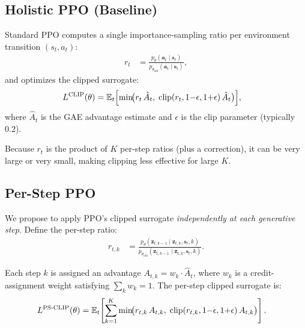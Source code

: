 \subsection{Holistic PPO (Baseline)}
\label{sec:method:holistic}

Standard PPO computes a single importance-sampling ratio per environment
transition $(s_t, a_t)$:
\begin{align}
  r_t
    &= \frac{p_\theta(\mathbf{a}_t\mid\mathbf{s}_t)}
            {p_{\theta_{\text{old}}}(\mathbf{a}_t\mid\mathbf{s}_t)},
  \label{eq:holistic_ratio}
\end{align}
and optimizes the clipped surrogate:
\begin{align}
  L^{\text{CLIP}}(\theta)
    &= \mathbb{E}_t\Bigl[
         \min\!\bigl(
           r_t\, \hat{A}_t,\;
           \mathrm{clip}(r_t, 1{-}\epsilon, 1{+}\epsilon)\,\hat{A}_t
         \bigr)
       \Bigr],
  \label{eq:ppo_clip}
\end{align}
where $\hat{A}_t$ is the GAE advantage estimate and $\epsilon$ is the clip
parameter (typically $0.2$).

Because $r_t$ is the product of $K$ per-step ratios (plus a correction),
it can be very large or very small, making clipping less effective for
large $K$.

\subsection{Per-Step PPO}
\label{sec:method:perstep}

We propose to apply PPO's clipped surrogate \emph{independently at each
generative step}.  Define the per-step ratio:
\begin{align}
  r_{t,k}
    &= \frac{p_\theta(\mathbf{z}_{t,k-1}\mid\mathbf{z}_{t,k},\mathbf{s}_t,k)}
            {p_{\theta_{\text{old}}}(\mathbf{z}_{t,k-1}\mid\mathbf{z}_{t,k},\mathbf{s}_t,k)}.
  \label{eq:perstep_ratio}
\end{align}

Each step $k$ is assigned an advantage $A_{t,k} = w_k \cdot \hat{A}_t$, where
$w_k$ is a credit-assignment weight satisfying $\sum_k w_k = 1$.  The per-step
clipped surrogate is:
\begin{align}
  L^{\text{PS-CLIP}}(\theta)
    &= \mathbb{E}_t\!\left[
         \sum_{k=1}^{K}
         \min\!\bigl(
           r_{t,k}\, A_{t,k},\;
           \mathrm{clip}(r_{t,k}, 1{-}\epsilon, 1{+}\epsilon)\, A_{t,k}
         \bigr)
       \right].
  \label{eq:perstep_clip}
\end{align}

